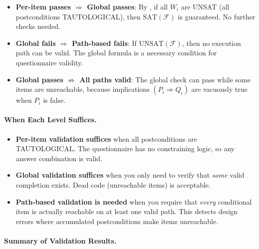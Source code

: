 \begin{itemize}
    \item \textbf{Per-item passes $\Rightarrow$ Global passes}: By , if all $W_i$ are UNSAT (all postconditions TAUTOLOGICAL), then $\mathrm{SAT}(\mathcal{F})$ is guaranteed. No further checks needed.

    \item \textbf{Global fails $\Rightarrow$ Path-based fails}: If $\mathrm{UNSAT}(\mathcal{F})$, then no execution path can be valid. The global formula is a necessary condition for questionnaire validity.

    \item \textbf{Global passes $\not\Rightarrow$ All paths valid}: The global check can pass while some items are unreachable, because implications $(P_i \Rightarrow Q_i)$ are vacuously true when $P_i$ is false.
\end{itemize}

\paragraph{When Each Level Suffices.}

\begin{itemize}
    \item \textbf{Per-item validation suffices} when all postconditions are TAUTOLOGICAL. The questionnaire has no constraining logic, so any answer combination is valid.

    \item \textbf{Global validation suffices} when you only need to verify that \emph{some} valid completion exists. Dead code (unreachable items) is acceptable.

    \item \textbf{Path-based validation is needed} when you require that \emph{every} conditional item is actually reachable on at least one valid path. This detects design errors where accumulated postconditions make items unreachable.
\end{itemize}

\paragraph{Summary of Validation Results.}

